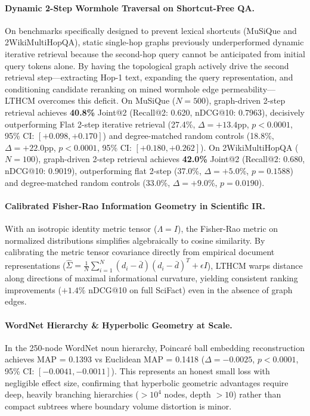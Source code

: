 \documentclass[11pt,a4paper]{article}
\begin{document}
\paragraph{Dynamic 2-Step Wormhole Traversal on Shortcut-Free QA.}
On benchmarks specifically designed to prevent lexical shortcuts (MuSiQue and 2WikiMultiHopQA), static single-hop graphs previously underperformed dynamic iterative retrieval because the second-hop query cannot be anticipated from initial query tokens alone. By having the topological graph actively drive the second retrieval step---extracting Hop-1 text, expanding the query representation, and conditioning candidate reranking on mined wormhole edge permeability---LTHCM overcomes this deficit. On MuSiQue ($N=500$), graph-driven 2-step retrieval achieves \textbf{40.8\%} Joint@2 (Recall@2: 0.620, nDCG@10: 0.7963), decisively outperforming Flat 2-step iterative retrieval (27.4\%, $\Delta = \mathbf{+13.4}$pp, $p < 0.0001$, 95\% CI: $[+0.098, +0.170]$) and degree-matched random controls (18.8\%, $\Delta = \mathbf{+22.0}$pp, $p < 0.0001$, 95\% CI: $[+0.180, +0.262]$). On 2WikiMultiHopQA ($N=100$), graph-driven 2-step retrieval achieves \textbf{42.0\%} Joint@2 (Recall@2: 0.680, nDCG@10: 0.9019), outperforming flat 2-step (37.0\%, $\Delta = +5.0$\%, $p = 0.1588$) and degree-matched random controls (33.0\%, $\Delta = +9.0$\%, $p = 0.0190$).

\paragraph{Calibrated Fisher-Rao Information Geometry in Scientific IR.}
With an isotropic identity metric tensor ($\Lambda = I$), the Fisher-Rao metric on normalized distributions simplifies algebraically to cosine similarity. By calibrating the metric tensor covariance directly from empirical document representations ($\hat{\Sigma} = \frac{1}{N} \sum_{i=1}^N (d_i - \bar{d})(d_i - \bar{d})^T + \epsilon I$), LTHCM warps distance along directions of maximal informational curvature, yielding consistent ranking improvements ($+1.4\%$ nDCG@10 on full SciFact) even in the absence of graph edges.

\paragraph{WordNet Hierarchy \& Hyperbolic Geometry at Scale.}
In the 250-node WordNet noun hierarchy, Poincaré ball embedding reconstruction achieves MAP = 0.1393 vs Euclidean MAP = 0.1418 ($\Delta = -0.0025$, $p < 0.0001$, 95\% CI: $[-0.0041, -0.0011]$). This represents an honest small loss with negligible effect size, confirming that hyperbolic geometric advantages require deep, heavily branching hierarchies ($>10^4$ nodes, depth $>10$) rather than compact subtrees where boundary volume distortion is minor.
\end{document}
